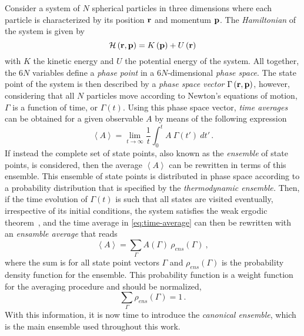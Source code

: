 Consider a system of $N$ spherical particles in three dimensions
where each particle is characterized by its position $\mathbf{r}$ and momentum $\mathbf{p}$.
The \emph{Hamiltonian} of the system is given by
\begin{equation}
    \mathcal{H} \left( \mathbf{r}, \mathbf{p} \right) = 
    K \left( \mathbf{p} \right) + U \left( \mathbf{r} \right)
    \label{eq:hamiltonian}
\end{equation}
with $K$ the kinetic energy and $U$ the potential energy of the system.
All together, the 6$N$ variables define a \emph{phase point} in a 6$N$-dimensional
\emph{phase space}. The state point of the system is then described by a
\emph{phase space vector} $\Gamma \left( \mathbf{r}, \mathbf{p} \right)$, however, considering that all
$N$ particles move according to Newton's equations of motion, $\Gamma$ is
a function of time, or $\Gamma(t)$. Using this phase space vector, \emph{time averages}
can be obtained for a given observable $A$ by means of the following expression
\begin{equation}
    \left< A \right> = \lim_{t \to \infty} \frac{1}{t} 
    \int_{0}^{t} A \: \Gamma(t') \: dt' \, .
    \label{eq:time-average}
\end{equation}
If instead the complete set of state points, also known as the \emph{ensemble} of state
points, is considered, then the average $\left< A \right>$ can be rewritten in
terms of this ensemble.
This ensemble of state points is distributed in phase space according to a probability 
distribution that is specified by the \emph{thermodynamic ensemble.} Then, if the time 
evolution of $\Gamma(t)$ is such that all states are visited eventually, irrespective of 
its initial conditions, the system satisfies the weak ergodic
theorem~\cite{kittelElementaryStatisticalPhysics2004},
and the time average in \autoref{eq:time-average} can then be rewritten with an
\emph{ensamble average} that reads
\begin{equation}
    \left< A \right> = \sum_{\Gamma} A(\Gamma) \: \rho_{ens} (\Gamma)
    \: ,
    \label{eq:ensemble-average}
\end{equation}
where the sum is for all state point vectors $\Gamma$ and $\rho_{ens} (\Gamma)$
is the probability density function for the ensemble. This probability function is
a weight function for the averaging procedure and should be normalized,
\begin{equation}
    \sum_{\Gamma} \rho_{ens} (\Gamma) = 1 \, .
    \label{eq:normalized}
\end{equation}
With this information, it is now time to introduce the \emph{canonical ensemble}, which
is the main ensemble used throughout this work.

